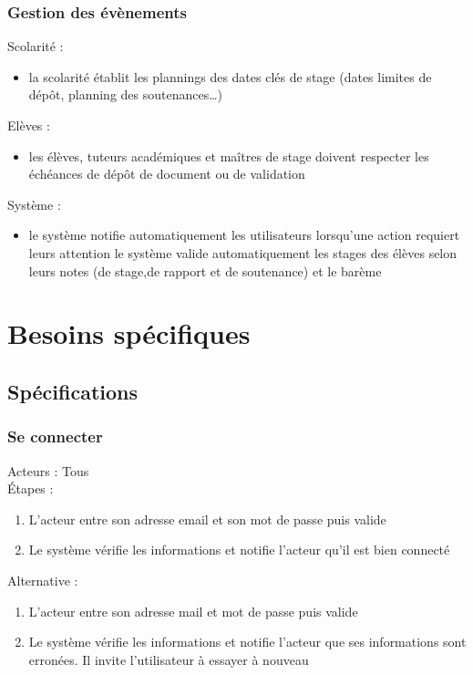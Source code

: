 \documentclass{scrreprt}
\begin{document}
\subsection{Gestion des \'ev\`enements}
Scolarit\'e :
\begin{itemize}
\item la scolarit\'e \'etablit les plannings des dates cl\'es de stage (dates limites de d\'ep\^ot, planning des soutenances…)
\end{itemize}

Elèves :
\begin{itemize}
\item les \'el\`eves, tuteurs acad\'emiques et ma\^itres de stage doivent respecter les \'ech\'eances de d\'ep\^ot de document ou de validation
\end{itemize}


Système :
\begin{itemize}
\item le syst\`eme notifie automatiquement les utilisateurs lorsqu’une action requiert leurs attention
le syst\`eme valide automatiquement les stages des \'el\`eves selon leurs notes (de stage,de rapport et de soutenance) et le barème
\end{itemize}
\chapter{Besoins spécifiques}
\section{Sp\'ecifications}
\subsection{Se connecter}
Acteurs : Tous 
\\
\'Etapes :
\begin{enumerate}
\item L’acteur entre son adresse email et son mot de passe puis valide
\item Le syst\`eme v\'erifie les informations et notifie l’acteur qu’il est bien connect\'e
\end{enumerate} 
Alternative : 
\begin{enumerate}
\item L’acteur entre son adresse mail et mot de passe puis valide
\item Le syst\`eme v\'erifie les informations et notifie l’acteur que ses informations sont erron\'ees. Il invite l’utilisateur \`a essayer \`a nouveau
\end{enumerate}
\end{document}
